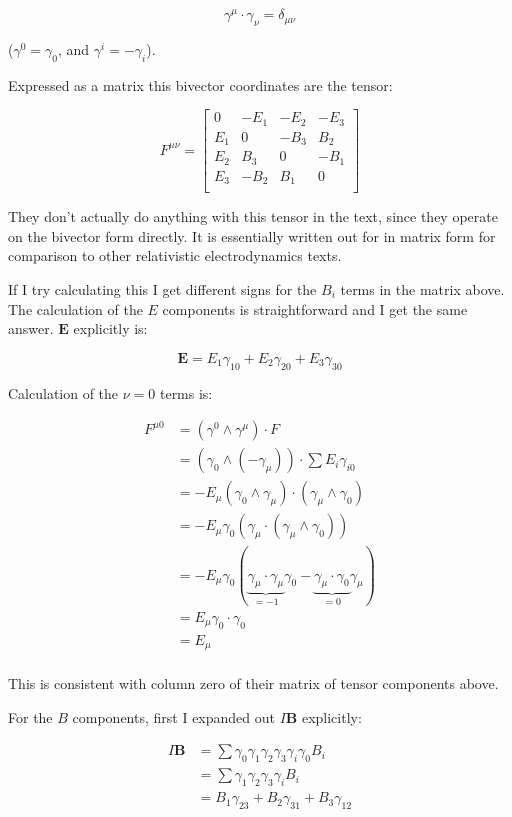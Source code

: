 \[
\gamma^\mu \cdot \gamma_\nu = \delta_{\mu\nu}
\]

($\gamma^0 = \gamma_0$, and $\gamma^i = -\gamma_i$).

Expressed as a matrix this bivector coordinates are the tensor:

\[
F^{\mu\nu} =
\begin{bmatrix}
0 & -E_1 & -E_2 & -E_3 \\
E_1 & 0 & -B_3 & B_2 \\
E_2 & B_3 & 0 & -B_1 \\
E_3 & -B_2 & B_1 & 0 \\
\end{bmatrix}
\]

They don't actually do anything with this tensor in the text, since they operate on the bivector form directly.  It is essentially written out for in matrix form for comparison to other relativistic electrodynamics texts.

If I try calculating this I get different signs for the $B_i$ terms in the matrix above.  The 
calculation of the $E$ components is straightforward and I get the same answer.  $\mathbf{E}$ explicitly is:

\[
\mathbf{E} = E_1 \gamma_{10} + E_2 \gamma_{20} + E_3 \gamma_{30}
\]

Calculation of the $\nu = 0$ terms is:

\begin{align*}
F^{\mu 0} 
&= (\gamma^0 \wedge \gamma^\mu) \cdot F \\
&= (\gamma_0 \wedge (-\gamma_\mu)) \cdot \sum E_i \gamma_{i0} \\
&= -E_\mu (\gamma_0 \wedge \gamma_\mu) \cdot (\gamma_\mu \wedge \gamma_{0}) \\
&= -E_\mu \gamma_0 (\gamma_\mu \cdot (\gamma_\mu \wedge \gamma_{0})) \\
&= -E_\mu \gamma_0 ( \underbrace{\gamma_\mu \cdot \gamma_\mu}_{=-1} \gamma_{0} - \underbrace{\gamma_\mu \cdot \gamma_{0}}_{=0} \gamma_\mu) \\
&= E_\mu \gamma_0 \cdot \gamma_0 \\
&= E_\mu \\
\end{align*}

This is consistent with column zero of their matrix of tensor components above.

For the $B$ components, first I expanded out $I\mathbf{B}$ explicitly:

\begin{align*}
I\mathbf{B} 
&= \sum \gamma_0 \gamma_1 \gamma_2 \gamma_3 \gamma_i \gamma_0 B_i \\
&= \sum \gamma_1 \gamma_2 \gamma_3 \gamma_i B_i \\
&= B_1 \gamma_{23} + B_2 \gamma_{31} + B_3 \gamma_{12}
\end{align*}

